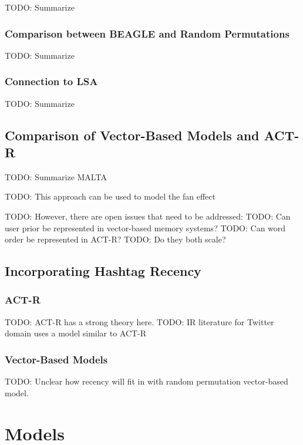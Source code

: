\documentclass[man]{apa6}
\begin{document}
TODO: Summarize \cite{Sahlgren2008}

\subsubsection{Comparison between BEAGLE and Random Permutations}

TODO: Summarize \cite{Recchia2010}

\subsubsection{Connection to LSA}

TODO: Summarize \cite{Kanerva2000}

\subsection{Comparison of Vector-Based Models and ACT-R}

TODO: Summarize MALTA \cite{Rutledge2007}

TODO: This approach can be used to model the fan effect \cite{Rutledge2008} 

TODO: However, there are open issues that need to be addressed:
TODO: Can user prior be represented in vector-based memory systems?
TODO: Can word order be represented in ACT-R?
TODO: Do they both scale?

\subsection{Incorporating Hashtag Recency}

\subsubsection{ACT-R}

TODO: ACT-R has a strong theory here.
TODO: IR literature for Twitter domain uses a model similar to ACT-R \cite{Efron2011}

\subsubsection{Vector-Based Models}

TODO: Unclear how recency will fit in with random permutation vector-based model.

\section{Models}
\end{document}
